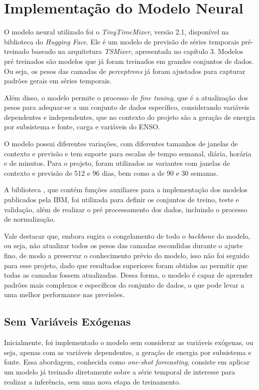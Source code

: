 \section{Implementação do Modelo Neural} %
O modelo neural utilizado foi o \textit{TinyTimeMixer}, versão 2.1, disponível na biblioteca  do \textit{Hugging Face}. Ele é
um modelo de previsão de séries temporais pré-treinado baseado na arquitetura \textit{TSMixer}, apresentada no capítulo 3. Modelos pré treinados são modelos
que já foram treinados em grandes conjuntos de dados. Ou seja, os pesos das camadas de \textit{perceptrons} já foram ajustados para capturar padrões gerais em séries temporais.

Além disso, o modelo permite o processo de \textit{fine tuning}, que é a atualização dos pesos para adequar-se
a um conjunto de dados específico, considerando variáveis dependentes e independentes, que no contexto do projeto são a geração de energia
por subsistema e fonte, carga e variáveis do ENSO.

O modelo possui diferentes variações, com diferentes tamanhos de janelas de contexto e previsão e tem suporte para escalas de tempo semanal, diária, horária e de minutos. 
Para o projeto, foram utilizados as variantes com janelas de contexto e previsão de 512 e 96 dias, bem como a de 90 e 30 semanas.

A biblioteca , que contém funções auxiliares para a implementação dos modelos publicados pela IBM, foi
utilizada para definir os conjuntos de treino, teste e validação, além de realizar o pré processamento dos dados, incluindo o
processo de normalização.

Vale destacar que, embora  sugira o congelamento de todo o \textit{backbone} do modelo, ou seja, 
não atualizar todos os pesos das camadas escondidas durante o ajuste fino, de modo a preservar o conhecimento prévio do modelo,
isso não foi seguido para esse projeto, dado que resultados superiores foram obtidos ao permitir que todas as camadas fossem atualizadas.
Dessa forma, o modelo é capaz de aprender padrões mais complexos e específicos do conjunto de dados, o que pode levar a uma melhor performance nas previsões.

\subsection{Sem Variáveis Exógenas} %
Inicialmente, foi implementado o modelo sem considerar as variáveis exógenas, ou seja, apenas com as variáveis dependentes, a 
geração de energia por subsistema e fonte. Essa abordagem, conhecida como \textit{one-shot forecasting}, consiste em aplicar 
um modelo já treinado diretamente sobre a série temporal de interesse para realizar a inferência, sem uma nova etapa de treinamento.

